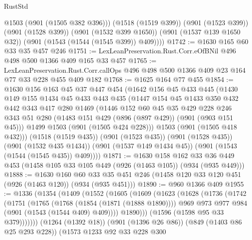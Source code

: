 \begin{lexlean}{RustStd}
\begin{coremodule}
          @1503
          (@901 (@1505 @382 @396)))
        (@1518 (@1519 @399))
        (@901 (@1523 @399))
        (@901 (@1528 @399))
        (@901 (@1532 @399 @1650))
        (@901 (@1537 @139 @1650 @32))
        (@901 (@1543 (@1544 (@1545 @399)) @409))))
@1742 := @1630 @165 @60 @33 @35 @457 @246
@1751 := LexLeanPreservation.Rust.Corr.eOfBNil @496 @498 @500 @1366 @409 @165 @33 @457
@1765 := LexLeanPreservation.Rust.Corr.callOps
    @496
    @498
    @500
    @1366
    @409
    @23
    @164
    @77
    @33
    @228
    @455
    @409
    @182
@1768 := @1625 @164 @77 @455
@1854 := @1630
    @156
    @163
    @45
    @37
    @447
    @454
    (@1642
      @156
      @45
      @433
      @445
      (@1430
        @149
        @155
        @1434
        @45
        @433
        @443
        @435
        (@1447
          @154
          @45
          @1433
          @350
          @432
          @442
          @343
          @417
          @280
          @1469
          (@1446
            @152
            @60
            @45
            @35
            @429
            @228
            @246
            @343
            @51
            @280
            (@1483 @151 @429 (@896 (@897 @429)) (@901 (@903 @151 @45)))
            @1499
            @1503
            (@901 (@1505 @424 @228)))
          @1503
          (@901 (@1505 @418 @432)))
        (@1518 (@1519 @435))
        (@901 (@1523 @435))
        (@901 (@1528 @435))
        (@901 (@1532 @435 @1434))
        (@901 (@1537 @149 @1434 @45))
        (@901 (@1543 (@1544 (@1545 @435)) @409))))
@1871 := @1630
    @158
    @162
    @33
    @36
    @449
    @453
    (@1458 @105 @33 @105 @449 (@926 (@1463 @105)) (@934 (@935 @449)))
@1888 := @1630
    @160
    @60
    @33
    @35
    @451
    @246
    (@1458 @120 @33 @120 @451 (@926 (@1463 @120)) (@934 (@935 @451)))
@1890 := @960 @1366 @409
@1955 := @1336
    (@1354
      (@1409
        (@1552
          (@1605
            (@1609
              (@1623
                (@1628
                  (@1736
                    (@1742
                      (@1751
                        (@1765
                          (@1768 (@1854 (@1871 (@1888 @1890))))
                          @969
                          @973
                          @977
                          @984
                          (@901 (@1543 (@1544 @409) @409))))
                      @1890)))
                (@1596 (@1598 @95 @33 @379)))))))
      (@1264 (@1392 @18))
      (@901 (@1396 @26 @86))
      (@849 (@1403 @86 @25 @293 @228))
      (@1573
        @1233
        @92
        @33
        @228
        @300

\end{coremodule}
\end{lexlean}
